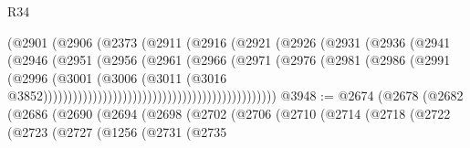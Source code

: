 \begin{lexlean}{R34}
\begin{coremodule}
                                                (@2901
                                                  (@2906
                                                    (@2373
                                                      (@2911
                                                        (@2916
                                                          (@2921
                                                            (@2926
                                                              (@2931
                                                                (@2936
                                                                  (@2941
                                                                    (@2946
                                                                      (@2951
                                                                        (@2956
                                                                          (@2961
                                                                            (@2966
                                                                              (@2971
                                                                                (@2976
                                                                                  (@2981
                                                                                    (@2986
                                                                                      (@2991
                                                                                        (@2996
                                                                                          (@3001
                                                                                            (@3006
                                                                                              (@3011
                                                                                                (@3016
                                                                                                  @3852)))))))))))))))))))))))))))))))))))))))))))))))
@3948 := @2674
    (@2678
      (@2682
        (@2686
          (@2690
            (@2694
              (@2698
                (@2702
                  (@2706
                    (@2710
                      (@2714
                        (@2718
                          (@2722
                            (@2723
                              (@2727
                                (@1256
                                  (@2731
                                    (@2735

\end{coremodule}
\end{lexlean}
